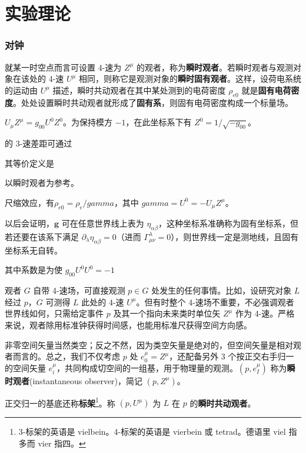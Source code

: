 \chapter{实验理论}\label{chpt:experiment}

\subsection{对钟}
就某一时空点而言可设置 4-速为 $Z^\mu$ 的观者，称为\textbf{瞬时观者}。若瞬时观者与观测对象在该处的 4-速 $U^\mu$ 相同，则称它是观测对象的\textbf{瞬时固有观者}。这样，设荷电系统的运动由 $U^\mu$ 描述，瞬时共动观者在其中某处测到的电荷密度 $\rho_{e0}$ 就是\textbf{固有电荷密度}。处处设置瞬时共动观者就形成了\textbf{固有系}，则固有电荷密度构成一个标量场。


$U_\mu Z^\mu=g_{00} U^0 Z^0$。为保持模方 $-1$，在此坐标系下有 $Z^0=1/\sqrt{-g_{00}}$。

的 3-速差距可通过




其等价定义是
 

以瞬时观者为参考。

尺缩效应，有$\rho_{e0}=\rho_e/gamma$，其中 $gamma=U^0=-U_\mu Z^\mu$。

以后会证明，$\bm g$ 可在任意世界线上表为 $\eta_{\alpha\beta}$，这种坐标系准确称为固有坐标系，但若还要在该系下满足 $\partial_\lambda\eta_{\alpha\beta}=0$（进而 $\Gamma^\lambda_{\mu\nu}=0$），则世界线一定是测地线，且固有坐标系无自转。

其中系数是为使 $g_{00}U^0U^0=-1$

观者 $G$ 自带 4-速场，可直接观测 $p\in G$ 处发生的任何事情。比如，设研究对象 $L$ 经过 $p$，$G$ 可测得 $L$ 此处的 4-速 $U^\mu$。但有时整个 4-速场不重要，不必强调观者世界线如何，只需给定事件 $p$ 及其一个指向未来类时单位矢 $Z^\mu$ 作为 4-速。严格来说，观者除用标准钟获得时间感，也能用标准尺获得空间方向感。

非零空间矢量当然类空；反之不然，因为类空矢量是绝对的，但空间矢量是相对观者而言的。总之，我们不仅考虑 $p$ 处 $e_0^\mu=Z^\mu$，还配备另外 3 个按正交右手归一的空间矢量 $e_i^\mu$，共同构成切空间的一组基，用于物理量的观测。$(p,e_I^\mu)$ 称为\textbf{瞬时观者}(instantaneous observer)，简记 $(p,Z^\mu)$。

正交归一的基底还称\textbf{标架}\footnote{3-标架的英语是 vielbein。4-标架的英语是 vierbein 或 tetrad。德语里 viel 指多而 vier 指四。}。称 $(p,U^\mu)$ 为 $L$ 在 $p$ 的\textbf{瞬时共动观者}。



